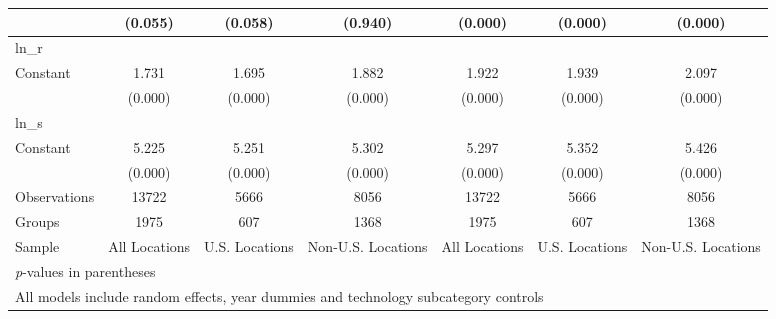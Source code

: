 \begin{table}[htbp]
\begin{tabular}{l*{6}{c}}
                &  (0.055)&  (0.058)&  (0.940)&  (0.000)&  (0.000)&  (0.000)\\
\hline
ln\_r            &         &         &         &         &         &         \\
Constant        &    1.731&    1.695&    1.882&    1.922&    1.939&    2.097\\
                &  (0.000)&  (0.000)&  (0.000)&  (0.000)&  (0.000)&  (0.000)\\
\hline
ln\_s            &         &         &         &         &         &         \\
Constant        &    5.225&    5.251&    5.302&    5.297&    5.352&    5.426\\
                &  (0.000)&  (0.000)&  (0.000)&  (0.000)&  (0.000)&  (0.000)\\
\hline
Observations    &    13722&     5666&     8056&    13722&     5666&     8056\\
Groups          &     1975&      607&     1368&     1975&      607&     1368\\
Sample          &All Locations&U.S. Locations&Non-U.S. Locations&All Locations&U.S. Locations&Non-U.S. Locations\\
\hline\hline
\multicolumn{7}{l}{\footnotesize \textit{p}-values in parentheses}\\
\multicolumn{7}{l}{\footnotesize All models include random effects, year dummies and technology subcategory controls}\\
\end{tabular}
\end{table}

